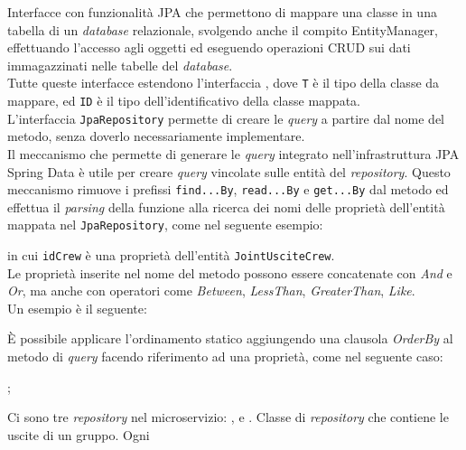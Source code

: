 \label{Repository}
Interfacce con funzionalità \gls{JPA} che permettono di mappare una classe in
una tabella di un \textit{database} relazionale, svolgendo anche il compito
\gls{EntityManager}, effettuando l'accesso agli oggetti ed eseguendo operazioni
\gls{CRUD} sui dati immagazzinati nelle tabelle del \textit{database}.\\
Tutte queste interfacce estendono l'interfaccia ,
dove \texttt{T} è il tipo della classe da mappare, ed \texttt{ID} è il tipo
dell'identificativo della classe mappata.\\
L'interfaccia \texttt{JpaRepository} permette di creare le \textit{query} a
partire dal nome del metodo, senza doverlo necessariamente implementare.\\
Il meccanismo che permette di generare le \textit{query} integrato
nell'infrastruttura JPA Spring Data è utile per creare \textit{query} vincolate
sulle entità del \textit{repository}. Questo meccanismo rimuove i prefissi
\texttt{find...By}, \texttt{read...By} e \texttt{get...By} dal metodo ed
effettua il \textit{parsing} della funzione alla ricerca dei nomi delle
proprietà dell'entità mappata nel \texttt{JpaRepository}, come nel seguente
esempio:
\begin{center}
\end{center}
in cui \texttt{idCrew} è una proprietà dell'entità \texttt{JointUsciteCrew}.\\
Le proprietà inserite nel nome del metodo possono essere concatenate con
\textit{And} e \textit{Or}, ma anche con operatori come \textit{Between},
\textit{LessThan}, \textit{GreaterThan}, \textit{Like}. \\
Un esempio è il seguente:
\begin{center}
\end{center}
È possibile applicare l'ordinamento statico aggiungendo una clausola
\textit{OrderBy} al metodo di \textit{query} facendo riferimento ad una
proprietà, come nel seguente caso:
\begin{center}
    ;
\end{center}
Ci sono tre \textit{repository} nel \gls{microservizio}:
,  e
.
\label{JointUsciteCrewRepository}
Classe di \textit{repository} che contiene le uscite di un gruppo. Ogni
